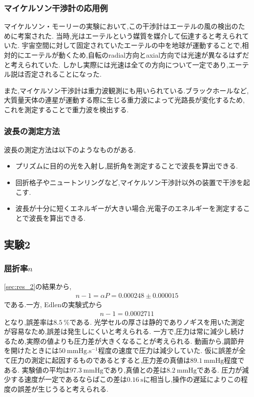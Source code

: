 \subsubsection{マイケルソン干渉計の応用例}
マイケルソン・モーリーの実験において,この干渉計はエーテルの風の検出のために考案された.
当時,光はエーテルという媒質を媒介して伝達すると考えられていた.
宇宙空間に対して固定されていたエーテルの中を地球が運動することで,相対的にエーテルが動くため,自転のradial方向とaxial方向では光速が異なるはずだと考えられていた.
しかし実際には光速は全ての方向について一定であり,エーテル説は否定されることになった.

また,マイケルソン干渉計は重力波観測にも用いられている.ブラックホールなど,大質量天体の連星が運動する際に生じる重力波によって光路長が変化するため,これを測定することで重力波を検出する.
\subsubsection{波長の測定方法}
波長の測定方法は以下のようなものがある.
\begin{itemize}
  \item プリズムに目的の光を入射し,屈折角を測定することで波長を算出できる.
  \item 回折格子やニュートンリングなど,マイケルソン干渉計以外の装置で干渉を起こす.
  \item 波長が十分に短くエネルギーが大きい場合,光電子のエネルギーを測定することで波長を算出できる.
\end{itemize}
\subsection{実験2}
\subsubsection{屈折率$n$}
\ref{sec:res_2}の結果から,
\begin{align*}
  n-1=\alpha P=0.000248\pm0.000015
\end{align*}
である.一方, Edlenの実験式から
\begin{align*}
  n-1=0.0002711
\end{align*}
となり,誤差率は$8.5~\%$である.
光学セルの厚さは静的でありノギスを用いた測定が容易なため,誤差は発生しにくいと考えられる.
一方で,圧力は常に減少し続けるため,実際の値よりも圧力差が大きくなることが考えられる.
動画から,調節弁を開けたときには$50~\si{\mmHg.\second^{-1}}$程度の速度で圧力は減少していた.
仮に誤差が全て圧力の測定に起因するものであるとすると,圧力差の真値は$89.1~\si{\mmHg}$程度である.
実験値の平均は$97.3~\si{\mmHg}$であり,真値との差は$8.2~\si{\mmHg}$である.
圧力が減少する速度が一定であるならばこの差は$0.16~\si{\second}$に相当し,操作の遅延によりこの程度の誤差が生じうると考えられる.

